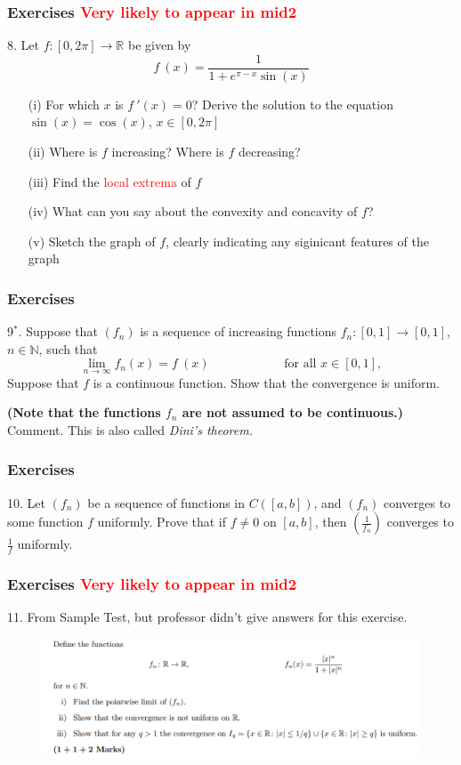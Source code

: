 \documentclass{beamer}
\newcommand{\myfont}{\rmfamily\normalsize\upshape\mdseries}
\newcommand{\R}{\mathbb{R}}
\begin{document}
\begin{frame}
    \frametitle{Exercises \textcolor{red}{Very likely to appear in mid2}}
    \hspace{1em} 8. Let $f: [0,2\pi ] \to \R$ be given by
    $$f~(x)=\frac{1}{1+e^{\pi-x }\sin (x)}$$
    \vspace{1em}
    \begin{itemize}
        \item[(i)] For which $x$ is $f~'(x)=0$? Derive the solution to the equation $\sin(x)=\cos(x)$, $x \in [0,2\pi]$
        \item[(ii)] Where is $f $ increasing? Where is $f $ decreasing?
        \item[(iii)] Find the \textcolor{red}{local extrema} of $f$
        \item[(iv)] What can you say about the convexity and concavity of $f$?
        \item[(v)] Sketch the graph of $f$, clearly indicating any siginicant features of the graph
    \end{itemize}
\end{frame}
\begin{frame}
    \frametitle{Exercises}
    \hspace{1em}
    9$^*$. Suppose that $(f_n)$ is a sequence of increasing functions
    $f_n: [0,1] \to [0,1]$, $n \in \mathbb{N}$, such that
    $$\underset{n\to \infty}{\lim} f_n(x) =f~(x) \text{ ~~~~~~~~~~~~~~~~ for all } x \in [0,1],$$
    Suppose that $f$ is a continuous function. Show that the convergence is uniform.
    \par \textbf{(Note that the functions $f_n$ are not assumed to be continuous.)}
    \\ \vspace{2em}
    Comment. This is also called \itshape Dini's theorem.\myfont
\end{frame}
\begin{frame}
    \frametitle{Exercises}
    \hspace{1em}
    10. Let $(f_n)$ be a sequence of functions in $C([a,b])$,
    and $(f_n)$ converges to some function $f$ uniformly.
    Prove that if $f\neq 0$ on $[a,b]$, then $(\frac{1}{f_n} )$ converges to $\frac{1}{f}$ uniformly.
\end{frame}

\begin{frame}
    \frametitle{Exercises \textcolor{red}{Very likely to appear in mid2}}
    \hspace{1em}
    11. From Sample Test, but professor didn't give answers for this exercise.
    \begin{figure}
        \centering
        \includegraphics[width=1\textwidth]{exercise.png}
    \end{figure}
\end{frame}
\end{document}
